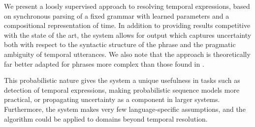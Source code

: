 We present a loosly supervised approach to resolving temporal expressions,
	based on synchronous parsing of a fixed grammar with learned parameters
	and a compositional representation of time.
In addition to providing results competitive with the state of the art,
	the system allows for output which captures uncertainty both with respect to 
	the syntactic structure of the phrase and the pragmatic ambiguity of 
	temporal utterances.
We also note that the approach is theoretically far better adapted for
	phrases more complex than those found in \tempeval.

This probabilistic nature gives the system a unique usefulness
	in tasks such as detection of temporal expressions, making probabilistic
	sequence models more practical, or propagating uncertainty as a
	component in larger systems.
Furthermore, the system makes very few language-specific assumptions,
	and the algorithm could be applied to domains beyond temporal resolution.

